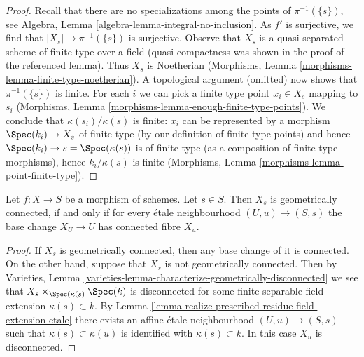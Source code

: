 \begin{proof}
Recall that there are no specializations among the points of $\pi^{-1}(\{s\})$,
see Algebra, Lemma \ref{algebra-lemma-integral-no-inclusion}.
As $f'$ is surjective, we find that $|X_s| \to \pi^{-1}(\{s\})$ is surjective.
Observe that $X_s$ is a quasi-separated scheme of finite type
over a field (quasi-compactness was shown in the proof of the
referenced lemma). Thus $X_s$ is Noetherian
(Morphisms, Lemma \ref{morphisms-lemma-finite-type-noetherian}).
A topological argument (omitted) now shows that $\pi^{-1}(\{s\})$ is finite.
For each $i$ we can pick a finite type point $x_i \in X_s$ mapping to $s_i$
(Morphisms, Lemma \ref{morphisms-lemma-enough-finite-type-points}).
We conclude that $\kappa(s_i)/\kappa(s)$ is finite:
$x_i$ can be represented by a morphism $\Spec(k_i) \to X_s$
of finite type (by our definition of finite type points)
and hence $\Spec(k_i) \to s = \Spec(\kappa(s))$ is of finite type
(as a composition of finite type morphisms),
hence $k_i/\kappa(s)$ is finite (Morphisms, Lemma
\ref{morphisms-lemma-point-finite-type}).
\end{proof}

\begin{lemma}
\label{lemma-characterize-geometrically-connected-fibres}
Let $f : X \to S$ be a morphism of schemes.
Let $s \in S$. Then $X_s$ is geometrically connected, if and
only if for every \'etale neighbourhood $(U, u) \to (S, s)$
the base change $X_U \to U$ has connected fibre $X_u$.
\end{lemma}

\begin{proof}
If $X_s$ is geometrically connected, then any base change of it is connected.
On the other hand, suppose that $X_s$ is not geometrically connected.
Then by
Varieties, Lemma
\ref{varieties-lemma-characterize-geometrically-disconnected}
we see that $X_s \times_{\Spec(\kappa(s)} \Spec(k)$ is
disconnected for some
finite separable field extension $\kappa(s) \subset k$. By
Lemma \ref{lemma-realize-prescribed-residue-field-extension-etale}
there exists an affine \'etale neighbourhood $(U, u) \to (S, s)$ such that
$\kappa(s) \subset \kappa(u)$ is identified with $\kappa(s) \subset k$.
In this case $X_u$ is disconnected.
\end{proof}

